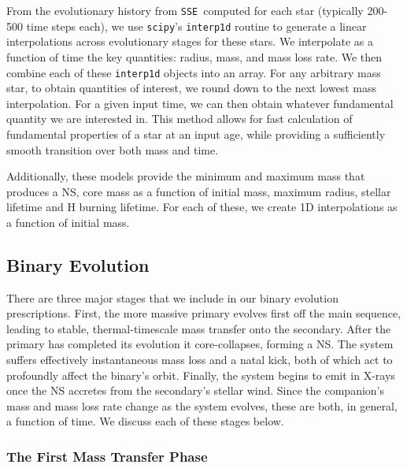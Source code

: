 \documentclass[12pt, preprint]{aastex}
\newcommand{\sse}{{\tt SSE}}
\begin{document}
From the evolutionary history from \sse\ computed for each star (typically 200-500 time steps each), we use {\tt scipy}'s {\tt interp1d} routine to generate a linear interpolations across evolutionary stages for these stars. We interpolate as a function of time the key quantities: radius, mass, and mass loss rate. We then combine each of these {\tt interp1d} objects into an array. For any arbitrary mass star, to obtain quantities of interest, we round down to the next lowest mass interpolation. For a given input time, we can then obtain whatever fundamental quantity we are interested in. This method allows for fast calculation of fundamental properties of a star at an input age, while providing a sufficiently smooth transition over both mass and time.

Additionally, these models provide the minimum and maximum mass that produces a NS, core mass as a function of initial mass, maximum radius, stellar lifetime and H burning lifetime. For each of these, we create 1D interpolations as a function of initial mass.



\subsection{Binary Evolution} \label{sec:binary_evolve}

There are three major stages that we include in our binary evolution prescriptions. First, the more massive primary evolves first off the main sequence, leading to stable, thermal-timescale mass transfer onto the secondary. After the primary has completed its evolution it core-collapses, forming a NS. The system suffers effectively instantaneous mass loss and a natal kick, both of which act to profoundly affect the binary's orbit. Finally, the system begins to emit in X-rays once the NS accretes from the secondary's stellar wind. Since the companion's mass and mass loss rate change as the system evolves, these are both, in general, a function of time. We discuss each of these stages below.


\subsubsection{The First Mass Transfer Phase} \label{sec:trans_MT}
\end{document}
